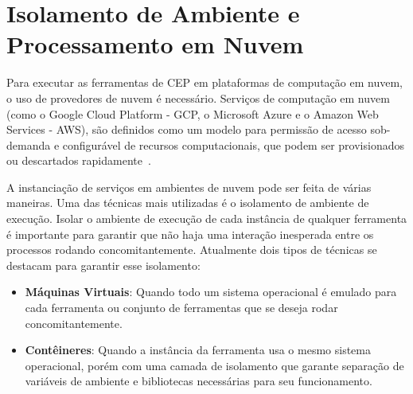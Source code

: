 \section{Isolamento de Ambiente e Processamento em Nuvem}
\label{sec:cloudtools}

Para executar as ferramentas de CEP em plataformas de computação em nuvem, o uso de provedores de nuvem é necessário. Serviços de computação em nuvem (como o Google Cloud Platform - GCP, o Microsoft Azure e o Amazon Web Services - AWS), são definidos como um modelo para permissão de acesso sob-demanda e configurável de recursos computacionais, que podem ser provisionados ou descartados rapidamente~\citep{CLoudComputing}. 











A instanciação de serviços em ambientes de nuvem pode ser feita de várias maneiras. Uma das técnicas mais utilizadas é o isolamento de ambiente de execução. Isolar o ambiente de execução de cada instância de qualquer ferramenta é importante para garantir que não haja uma interação inesperada entre os processos rodando concomitantemente.
Atualmente dois tipos de técnicas se destacam para garantir esse isolamento:
\begin{itemize}
    \item \textbf{Máquinas Virtuais}: Quando todo um sistema operacional é emulado para cada ferramenta ou conjunto de ferramentas que se deseja rodar concomitantemente. 
    \item \textbf{Contêineres}: Quando a instância da ferramenta usa o mesmo sistema operacional, porém com uma camada de isolamento que garante separação de variáveis de ambiente e bibliotecas necessárias para seu funcionamento.
\end{itemize}

